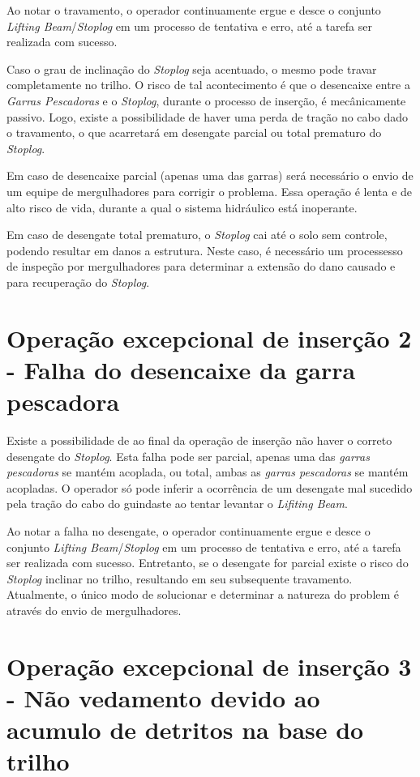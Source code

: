 Ao notar o travamento, o operador continuamente ergue e desce o
conjunto \emph{Lifting Beam}/\emph{Stoplog} em um 
processo de tentativa e erro, até a tarefa ser realizada com
sucesso.

Caso o grau de inclinação do \emph{Stoplog} seja acentuado, o mesmo pode travar completamente no trilho. O risco 
de tal acontecimento é que o desencaixe entre a \emph{Garras Pescadoras} e o \emph{Stoplog}, durante o processo de inserção, 
é  mecânicamente passivo. Logo, existe a possibilidade de haver uma perda de
tração no cabo dado o travamento, o que acarretará em desengate parcial ou total
prematuro do \emph{Stoplog}.

Em caso de desencaixe parcial (apenas uma das
garras) será necessário o envio de um equipe de mergulhadores para corrigir o
problema. Essa operação é lenta e de alto risco de vida, durante a qual o
sistema hidráulico está inoperante.

Em caso de desengate total prematuro, o \emph{Stoplog} cai até o solo sem
controle, podendo resultar em danos a estrutura. Neste caso, é necessário um
processesso de inspeção por mergulhadores para determinar a extensão do dano causado e para recuperação do \emph{Stoplog}.




\section{Operação excepcional de inserção 2 - Falha do desencaixe da garra pescadora}
\label{op:ins:2}

Existe a possibilidade de ao final da operação de inserção não haver o correto desengate do \emph{Stoplog}. 
Esta falha pode ser parcial, apenas uma das \emph{garras pescadoras} se mantém acoplada, ou total, ambas as 
\emph{garras pescadoras} se mantém acopladas. O operador só pode inferir a
ocorrência de um desengate mal sucedido pela tração do cabo do guindaste ao tentar levantar o \emph{Lifiting Beam}.

Ao notar a falha no desengate, o operador continuamente ergue e desce o
conjunto \emph{Lifting Beam}/\emph{Stoplog} em um 
processo de tentativa e erro, até a tarefa ser realizada com sucesso. Entretanto, se o desengate for parcial existe o risco do \emph{Stoplog} inclinar no trilho, resultando em seu subsequente travamento. Atualmente, o único modo de solucionar e determinar a natureza do problem é através do envio de mergulhadores. 

\section{Operação excepcional de inserção 3 - Não vedamento devido ao acumulo de detritos na base do trilho}


